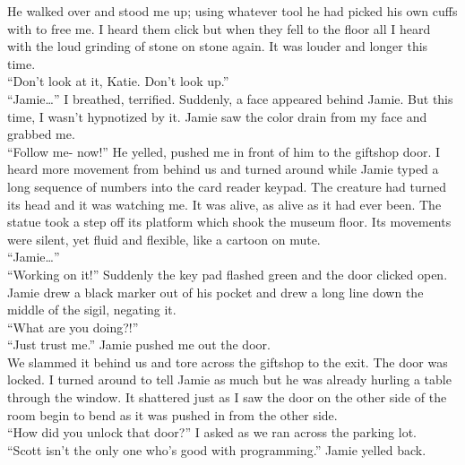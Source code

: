 \documentclass[a5paper]{scrartcl}
\begin{document}
He walked over and stood me up; using whatever tool he had picked his own cuffs with to free me. I heard them click but when they fell to the floor all I heard with the loud grinding of stone on stone again. It was louder and longer this time.\\


\enquote{Don't look at it, Katie. Don't look up.}\\


\enquote{Jamie\dots } I breathed, terrified. Suddenly, a face appeared behind Jamie. But this time, I wasn't hypnotized by it. Jamie saw the color drain from my face and grabbed me.\\


\enquote{Follow me- now!} He yelled, pushed me in front of him to the giftshop door. I heard more movement from behind us and turned around while Jamie typed a long sequence of numbers into the card reader keypad. The creature had turned its head and it was watching me. It was alive, as alive as it had ever been. The statue took a step off its platform which shook the museum floor. Its movements were silent, yet fluid and flexible, like a cartoon on mute.\\


\enquote{Jamie\dots }\\


\enquote{Working on it!} Suddenly the key pad flashed green and the door clicked open. Jamie drew a black marker out of his pocket and drew a long line down the middle of the sigil, negating it. \\


\enquote{What are you doing?!}\\


\enquote{Just trust me.} Jamie pushed me out the door.\\


We slammed it behind us and tore across the giftshop to the exit. The door was locked. I turned around to tell Jamie as much but he was already hurling a table through the window. It shattered just as I saw the door on the other side of the room begin to bend as it was pushed in from the other side.\\


\enquote{How did you unlock that door?} I asked as we ran across the parking lot.\\


\enquote{Scott isn't the only one who's good with programming.} Jamie yelled back. \\
\end{document}
